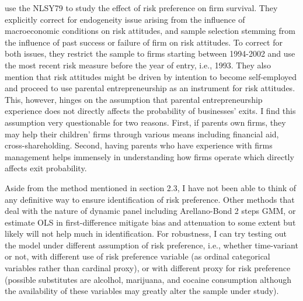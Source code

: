 \documentclass[]{article}
\begin{document}
\citet{cho2021endogenous} use the NLSY79 to study the effect of risk preference on firm survival. They explicitly correct for endogeneity issue arising from the influence of macroeconomic conditions on risk attitudes, and sample selection stemming from the influence of past success or failure of firm on risk attitudes. To correct for both issues, they restrict the sample to firms starting between 1994-2002 and use the most recent risk measure before the year of entry, i.e., 1993. They also mention that risk attitudes might be driven by intention to become self-employed and proceed to use parental entrepreneurship as an instrument for risk attitudes. This, however, hinges on the assumption that parental entrepreneurship experience does not directly affects the probability of businesses' exits. I find this assumption very questionable for two reasons. First, if parents own firms, they may help their children' firms through various means including financial aid, cross-shareholding. Second, having parents who have experience with firms management helps immensely in understanding how firms operate which directly affects exit probability. 

Aside from the method mentioned in section 2.3, I have not been able to think of any definitive way to ensure identification of risk preference. Other methods that deal with the nature of dynamic panel including Arellano-Bond 2 steps GMM, or estimate OLS in first-difference mitigate bias and attenuation to some extent but likely will not help much in identification. For robustness, I can try testing out the model under different assumption of risk preference, i.e., whether time-variant or not, with different use of risk preference variable (as ordinal categorical variables rather than cardinal proxy), or with different proxy for risk preference (possible substitutes are alcolhol, marijuana, and cocaine consumption although the availability of these variables may greatly alter the sample under study).  

\pagebreak

	
\end{document}
